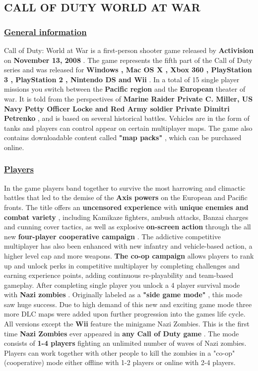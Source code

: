 \documentclass[a4paper,10pt]{book}
\begin{document}
 \subsection{CALL OF DUTY WORLD AT WAR }
 \subsubsection{\underline{General information }}
 
        Call of Duty: World at War is a first-person shooter game released by  \textbf{Activision }  on  \textbf{November 13, 2008 } .
        The game represents the fifth part of the Call of Duty series and was released for  \textbf{Windows , Mac OS X , Xbox 360 , PlayStation 3 , PlayStation 2 , Nintendo DS and Wii } .
        In a total of 15 single player missions you switch between the  \textbf{Pacific region }  and the  \textbf{European }  theater of war. 
        It is told from the perspectives of  \textbf{Marine Raider Private C. Miller, US Navy Petty Officer Locke and Red Army soldier Private Dimitri Petrenko } , and is based on several historical battles.
        Vehicles are in the form of tanks and players can control appear on certain multiplayer maps. The game also contains downloadable content called  \textbf{"map packs" } , which can be purchased online.
         
 \subsubsection{\underline{Players }}
 
        In the game players band together to survive the most harrowing and climactic battles that led to the demise of the  \textbf{Axis powers } on the European and Pacific fronts.
        The title offers an  \textbf{uncensored experience }  with  \textbf{unique enemies and combat variety } , including Kamikaze fighters, ambush attacks, Banzai charges and cunning cover tactics, as well as explosive  \textbf{on-screen action }  through the all new  \textbf{four-player cooperative campaign } . 
        The addictive competitive multiplayer has also been enhanced with new infantry and vehicle-based action, a higher level cap and more weapons.
         \textbf{The co-op campaign }  allows players to rank up and unlock perks in competitive multiplayer by completing challenges and earning experience points, adding continuous re-playability and team-based gameplay.
        After completing single player you unlock a 4 player survival mode with  \textbf{Nazi zombies } . 
        Originally labeled as a  \textbf{"side game mode" } , this mode saw huge success.
        Due to high demand of this new and exciting game mode three more DLC maps were added upon further progression into the games life cycle.
        All versions except the  \textbf{Wii }  feature the minigame Nazi Zombies. 
        This is the first time  \textbf{Nazi Zombies }  ever appeared in  \textbf{any Call of Duty game } . The mode consists of  \textbf{1-4 players }  fighting an unlimited number of waves of Nazi zombies. Players can work together with other people to kill the zombies in a "co-op" (cooperative) mode either offline with 1-2 players or online with 2-4 players.
         
\end{document}
